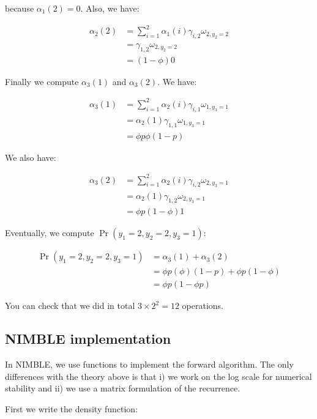 \documentclass[
  12pt,
]{krantz}
\begin{document}
because \(\alpha_1(2) = 0\). Also, we have:

\begin{align*}
\alpha_2(2) &= \sum_{i=1}^2 \alpha_1(i) \gamma_{i,2} \omega_{2,y_2=2}\\
            &= \gamma_{1,2} \omega_{2,y_2=2}\\
            &= (1-\phi) 0
\end{align*}

Finally we compute \(\alpha_3(1)\) and \(\alpha_3(2)\). We have:

\begin{align*}
\alpha_3(1) &= \sum_{i=1}^2 \alpha_2(i) \gamma_{i,1} \omega_{1,y_3=1}\\
            &= \alpha_2(1) \gamma_{1,1} \omega_{1,y_3=1}\\
            &= \phi p \phi (1-p)
\end{align*}

We also have:

\begin{align*}
\alpha_3(2) &= \sum_{i=1}^2 \alpha_2(i) \gamma_{i,2} \omega_{2,y_3=1}\\
            &= \alpha_2(1) \gamma_{1,2} \omega_{2,y_3=1}\\
            &= \phi p (1-\phi) 1
\end{align*}

Eventually, we compute \(\Pr(y_1=2,y_2=2,y_3=1)\):

\begin{align*}
\Pr(y_1=2,y_2=2,y_3=1) &= \alpha_3(1) + \alpha_3(2)\\
            &= \phi p (\phi) (1-p) + \phi p (1-\phi)\\
            &= \phi p (1-\phi p)
\end{align*}

You can check that we did in total \(3 \times 2^2 = 12\) operations.

\hypertarget{nimble-implementation-1}{%
\subsection{NIMBLE implementation}\label{nimble-implementation-1}}

In NIMBLE, we use functions to implement the forward algorithm. The only differences with the theory above is that i) we work on the log scale for numerical stability and ii) we use a matrix formulation of the recurrence.

First we write the density function:
\end{document}
